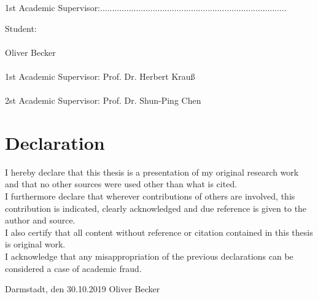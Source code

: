 \documentclass[11pt]{scrartcl}
\begin{document}
1st Academic Supervisor:..............................................................................
\clearpage

\noindent
Student:\\
\\
Oliver \hspace{6cm} Becker\\
\\
1st Academic Supervisor: Prof. Dr. Herbert Krauß\\
\\
2st Academic Supervisor: Prof. Dr. Shun-Ping Chen
\section*{Declaration}
I hereby declare that this thesis is a presentation of my original research work and that no other sources were used other
than what is cited.\\
I furthermore declare that wherever contributions of others are involved, this contribution is indicated, clearly
acknowledged and due reference is given to the author and source.\\
I also certify that all content without reference or citation contained in this thesis is original work.\\
I acknowledge that any misappropriation of the previous declarations can be considered a case of academic fraud.
\par\vspace{2cm}\noindent
Darmstadt, den 30.10.2019 \hspace*{0pt}\hfill Oliver Becker
\clearpage

\tableofcontents
\clearpage

\end{document}
